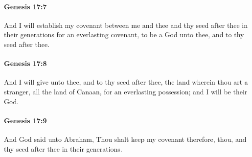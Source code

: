 		\paragraph{Genesis 17:7} %
			\label{GENESIS-17-7}

			And I will establish my covenant between me and thee and thy seed after thee in their generations for an everlasting covenant, to be a God unto thee, and to thy seed after thee.


		\paragraph{Genesis 17:8} %
			\label{GENESIS-17-8}

			And I will give unto thee, and to thy seed after thee, the land wherein thou art a stranger, all the land of Canaan, for an everlasting possession; and I will be their God.


		\paragraph{Genesis 17:9} %
			\label{GENESIS-17-9}

			And God said unto Abraham, Thou shalt keep my covenant therefore, thou, and thy seed after thee in their generations.


